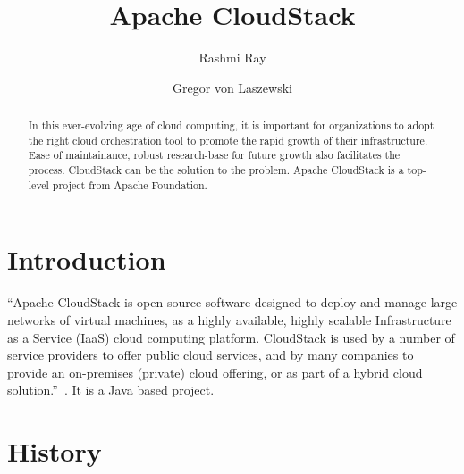 
\title{Apache CloudStack}


\author{Rashmi Ray}

\author{Gregor von Laszewski}


\renewcommand{\shortauthors}{G. v. Laszewski}


\begin{abstract}

  In this ever-evolving age of cloud computing, it is important for
  organizations to adopt the right cloud orchestration tool to promote
  the rapid growth of their infrastructure. Ease of maintainance, 
  robust research-base for future growth
  also facilitates the process. CloudStack can be the solution to 
  the problem. Apache CloudStack is a top-level project from Apache Foundation.

\end{abstract}


\maketitle

\section{Introduction}

``Apache CloudStack is open source software designed to deploy and
manage large networks of virtual machines, as a highly available,
highly scalable Infrastructure as a Service (IaaS) cloud computing
platform. CloudStack is used by a number of service providers to offer
public cloud services, and by many companies to provide an on-premises
(private) cloud offering, or as part of a hybrid cloud
solution.''~\cite{hid-sp18-417-www-cloudstack-intro}. It is a Java based project.


\section{History}

